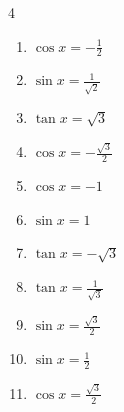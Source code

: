 \begin{multicols}{4}
\begin{enumerate}

  \item $\displaystyle \cos{x}  = -\frac{1}{2}$


  \item $\displaystyle \sin{x}  = \frac{1}{\sqrt{2}}$


  \item $\displaystyle \tan{x}  = \sqrt{3}$


  \item $\displaystyle \cos{x}  = -\frac{\sqrt{3}}{2}$


  \item $\displaystyle \cos{x}  = -1$


  \item $\displaystyle \sin{x}  = 1$


  \item $\displaystyle \tan{x}  = -\sqrt{3}$


\columnbreak %

  \item $\displaystyle \tan{x}  = \frac{1}{\sqrt{3}}$


  \item $\displaystyle \sin{x}  = \frac{\sqrt{3}}{2}$


  \item $\displaystyle \sin{x}  = \frac{1}{2}$


  \item $\displaystyle \cos{x}  = \frac{\sqrt{3}}{2}$


\end{enumerate}
\end{multicols}
